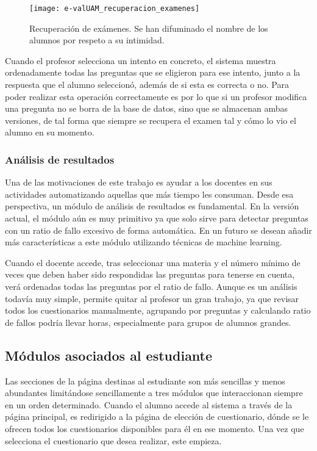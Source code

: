 \begin{figure}[htp!]
	\centering
	\texttt{[image: e-valUAM\_recuperacion\_examenes]}
	\caption[Recuperación de exámenes]{Recuperación de exámenes. Se han difuminado el nombre de los alumnos por respeto a su intimidad.}
	\label{fig:e-valUAM recuperacion examenes profesor}
\end{figure}

Cuando el profesor selecciona un intento en concreto, el sistema muestra ordenadamente todas las preguntas que se eligieron para ese intento, junto a la respuesta que el alumno seleccionó, además de si esta es correcta o no. Para poder realizar esta operación correctamente es por lo que si un profesor modifica una pregunta no se borra de la base de datos, sino que se almacenan ambas versiones, de tal forma que siempre se recupera el examen tal y cómo lo vio el alumno en su momento.

\subsubsection{Análisis de resultados}

Una de las motivaciones de este trabajo es ayudar a los docentes en sus actividades automatizando aquellas que más tiempo les consuman. Desde esa perspectiva, un módulo de análisis de resultados es fundamental. En la versión actual, el módulo aún es muy primitivo ya que solo sirve para detectar preguntas con un ratio de fallo excesivo de forma automática. En un futuro se desean añadir más características a este módulo utilizando técnicas de machine learning.

Cuando el docente accede, tras seleccionar una materia y el número mínimo de veces que deben haber sido respondidas las preguntas para tenerse en cuenta, verá ordenadas todas las preguntas por el ratio de fallo. Aunque es un análisis todavía muy simple, permite quitar al profesor un gran trabajo, ya que revisar todos los cuestionarios manualmente, agrupando por preguntas y calculando ratio de fallos podría llevar horas, especialmente para grupos de alumnos grandes.

\subsection{Módulos asociados al estudiante}

Las secciones de la página destinas al estudiante son más sencillas y menos abundantes limitándose sencillamente a tres módulos que interaccionan siempre en un orden determinado. Cuando el alumno accede al sistema a través de la página principal, es redirigido a la página de elección de cuestionario, dónde se le ofrecen todos los cuestionarios disponibles para él en ese momento. Una vez que selecciona el cuestionario que desea realizar, este empieza.

